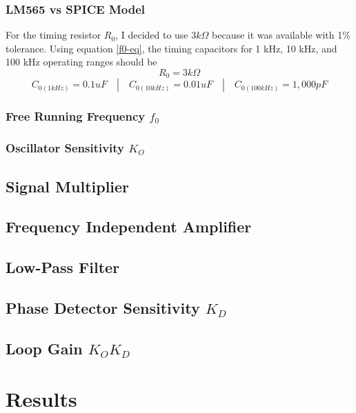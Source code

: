 \documentclass[titlepage, letterpaper, 10.5pt]{article}
\begin{document}
\subsubsection{LM565 vs SPICE Model}

For the timing resistor $R_{0}$, I decided to use $3k\Omega$ because it was available with 1\% tolerance.
Using equation \ref{f0-eq}, the timing capacitors for 1 kHz, 10 kHz, and 100 kHz operating ranges should be
\begin{equation*}
R_{0}=3k\Omega
\end{equation*}
\begin{equation*}
C_{0(1kHz)}=0.1uF \quad | \quad C_{0(10kHz)}=0.01uF \quad | \quad C_{0(100kHz)}=1,000pF
\end{equation*}

\subsubsection{Free Running Frequency $f_{0}$}

\subsubsection{Oscillator Sensitivity $K_{O}$}

\subsection{Signal Multiplier}

\subsection{Frequency Independent Amplifier}

\subsection{Low-Pass Filter}

\subsection{Phase Detector Sensitivity $K_{D}$}

\subsection{Loop Gain $K_{O}K_{D}$}

\section{Results}
\end{document}
